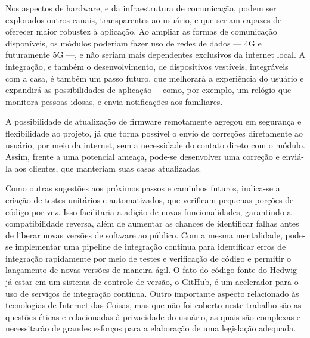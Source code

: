 Nos aspectos de hardware, e da infraestrutura de comunicação, podem ser explorados outros canais, transparentes ao usuário, e que seriam capazes de oferecer maior robustez à aplicação. Ao ampliar as formas de comunicação disponíveis, os módulos poderiam fazer uso de redes de dados --- 4G e futuramente 5G ---, e não seriam mais dependentes exclusivos da internet local. A integração, e também o desenvolvimento, de dispositivos vestíveis, integráveis com a casa, é também um passo futuro, que melhorará a experiência do usuário e expandirá as possibilidades de aplicação ---como, por exemplo, um relógio que monitora pessoas idosas, e envia notificações aos familiares.

A possibilidade de atualização de firmware remotamente agregou em segurança e flexibilidade ao projeto, já que torna possível o envio de correções diretamente ao usuário, por meio da internet, sem a necessidade do contato direto com o módulo. Assim, frente a uma potencial ameaça, pode-se desenvolver uma correção e enviá-la aos clientes, que manteriam suas casas atualizadas.

Como outras sugestões aos próximos passos e caminhos futuros, indica-se a criação de testes unitários e automatizados, que verificam pequenas porções de código por vez. Isso facilitaria a adição de novas funcionalidades, garantindo a compatibilidade reversa, além de aumentar as chances de identificar falhas antes de liberar novas versões de software ao público. Com a mesma mentalidade, pode-se implementar uma pipeline de integração contínua para identificar erros de integração rapidamente por meio de testes e verificação de código e permitir o lançamento de novas versões de maneira ágil. O fato do código-fonte do Hedwig já estar em um sistema de controle de versão, o GitHub, é um acelerador para o uso de serviços de integração contínua. Outro importante aspecto relacionado às tecnologias de Internet das Coisas, mas que não foi coberto neste trabalho são as questões éticas e relacionadas à privacidade do usuário, as quais são complexas e necessitarão de grandes esforços para a elaboração de uma legislação adequada.
